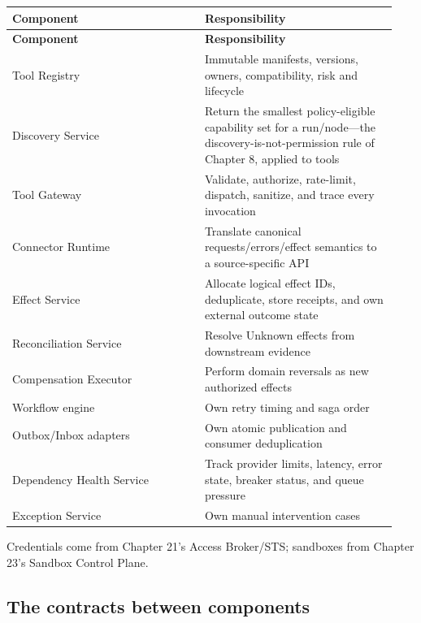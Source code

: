 \BookTableStart
\small
\begin{longtable}{@{}Y{0.4700\linewidth}Y{0.4700\linewidth}@{}}
\color{white}\bfseries \textbf{Component} & \color{white}\bfseries \textbf{Responsibility} \\
\endfirsthead
{}
\color{white}\bfseries \textbf{Component} & \color{white}\bfseries \textbf{Responsibility} \\
\endhead
Tool Registry & Immutable manifests, versions, owners, compatibility, risk and lifecycle \\
Discovery Service & Return the smallest policy-eligible capability set for a run/node—the discovery-is-not-permission rule of Chapter 8, applied to tools \\
Tool Gateway & Validate, authorize, rate-limit, dispatch, sanitize, and trace every invocation \\
Connector Runtime & Translate canonical requests/errors/effect semantics to a source-specific API \\
Effect Service & Allocate logical effect IDs, deduplicate, store receipts, and own external outcome state \\
Reconciliation Service & Resolve Unknown effects from downstream evidence \\
Compensation Executor & Perform domain reversals as new authorized effects \\
Workflow engine & Own retry timing and saga order \\
Outbox/Inbox adapters & Own atomic publication and consumer deduplication \\
Dependency Health Service & Track provider limits, latency, error state, breaker status, and queue pressure \\
Exception Service & Own manual intervention cases \\
\end{longtable}
\BookTableEnd

Credentials come from Chapter 21's Access Broker/STS; sandboxes from Chapter 23's Sandbox Control Plane.\par

\subsection{The contracts between components}

